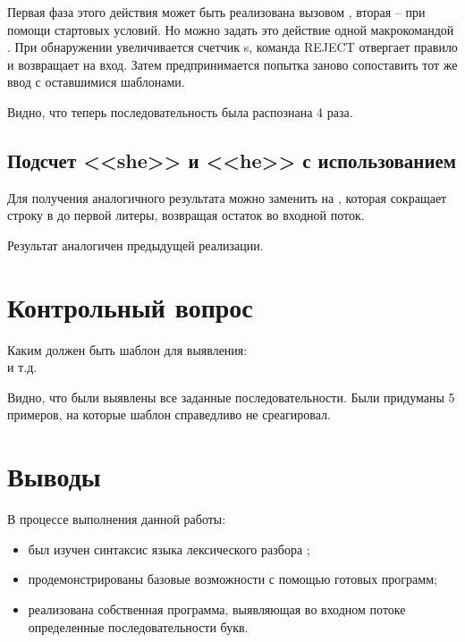 Первая фаза этого действия может быть реализована вызовом , вторая -- при помощи стартовых условий. Но можно задать это действие одной макрокомандой . При обнаружении  увеличивается счетчик s, команда REJECT отвергает правило и возвращает  на вход. Затем предпринимается попытка заново сопоставить тот же ввод с оставшимися шаблонами.



Видно, что теперь последовательность  была распознана 4 раза.

\subsection{Подсчет <<she>> и <<he>> с использованием }

Для получения аналогичного результата можно заменить  на , которая сокращает строку в  до первой литеры, возвращая остаток во входной
поток.



Результат аналогичен предыдущей реализации.

\newpage

\section{Контрольный вопрос}

Каким должен быть шаблон для выявления:    \\  и т.д.



Видно, что были выявлены все заданные последовательности. Были придуманы 5 примеров, на которые шаблон справедливо не среагировал.

\section{Выводы}

В процессе выполнения данной работы:

\begin{itemize}
	\item был изучен синтаксис языка лексического разбора ;
	\item продемонстрированы базовые возможности  с помощью готовых программ;
	\item реализована собственная программа, выявляющая во входном потоке определенные последовательности букв.
\end{itemize}


